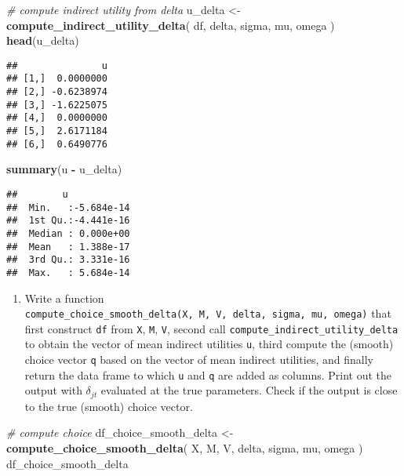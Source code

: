\documentclass[
]{book}
\newenvironment{Shaded}{\begin{snugshade}}{\end{snugshade}}
\newcommand{\CommentTok}[1]{\textcolor[rgb]{0.56,0.35,0.01}{\textit{#1}}}
\newcommand{\FunctionTok}[1]{\textcolor[rgb]{0.13,0.29,0.53}{\textbf{#1}}}
\newcommand{\NormalTok}[1]{#1}
\newcommand{\OtherTok}[1]{\textcolor[rgb]{0.56,0.35,0.01}{#1}}
\newcommand{\SpecialCharTok}[1]{\textcolor[rgb]{0.81,0.36,0.00}{\textbf{#1}}}
\providecommand{\tightlist}{%
  \setlength{\itemsep}{0pt}\setlength{\parskip}{0pt}}
\begin{document}
\begin{Shaded}
\begin{Highlighting}[]
\CommentTok{\# compute indirect utility from delta}
\NormalTok{u\_delta }\OtherTok{\textless{}{-}}
  \FunctionTok{compute\_indirect\_utility\_delta}\NormalTok{(}
\NormalTok{    df, }
\NormalTok{    delta, }
\NormalTok{    sigma,}
\NormalTok{    mu, }
\NormalTok{    omega}
\NormalTok{    )}
\FunctionTok{head}\NormalTok{(u\_delta)}
\end{Highlighting}
\end{Shaded}

\begin{verbatim}
##               u
## [1,]  0.0000000
## [2,] -0.6238974
## [3,] -1.6225075
## [4,]  0.0000000
## [5,]  2.6171184
## [6,]  0.6490776
\end{verbatim}

\begin{Shaded}
\begin{Highlighting}[]
\FunctionTok{summary}\NormalTok{(u }\SpecialCharTok{{-}}\NormalTok{ u\_delta)}
\end{Highlighting}
\end{Shaded}

\begin{verbatim}
##        u             
##  Min.   :-5.684e-14  
##  1st Qu.:-4.441e-16  
##  Median : 0.000e+00  
##  Mean   : 1.388e-17  
##  3rd Qu.: 3.331e-16  
##  Max.   : 5.684e-14
\end{verbatim}

\begin{enumerate}
\def\labelenumi{\arabic{enumi}.}
\setcounter{enumi}{5}
\tightlist
\item
  Write a function \texttt{compute\_choice\_smooth\_delta(X,\ M,\ V,\ delta,\ sigma,\ mu,\ omega)} that first construct \texttt{df} from \texttt{X}, \texttt{M}, \texttt{V}, second call \texttt{compute\_indirect\_utility\_delta} to obtain the vector of mean indirect utilities \texttt{u}, third compute the (smooth) choice vector \texttt{q} based on the vector of mean indirect utilities, and finally return the data frame to which \texttt{u} and \texttt{q} are added as columns. Print out the output with \(\delta_{jt}\) evaluated at the true parameters. Check if the output is close to the true (smooth) choice vector.
\end{enumerate}

\begin{Shaded}
\begin{Highlighting}[]
\CommentTok{\# compute choice}
\NormalTok{df\_choice\_smooth\_delta }\OtherTok{\textless{}{-}} 
  \FunctionTok{compute\_choice\_smooth\_delta}\NormalTok{(}
\NormalTok{    X, }
\NormalTok{    M, }
\NormalTok{    V, }
\NormalTok{    delta, }
\NormalTok{    sigma, }
\NormalTok{    mu, }
\NormalTok{    omega}
\NormalTok{    )}
\NormalTok{df\_choice\_smooth\_delta}
\end{Highlighting}
\end{Shaded}
\end{document}
